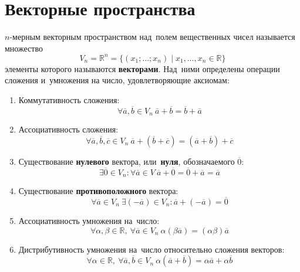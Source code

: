 \section{Векторные пространства}
$n$\nobreakdash-мерным векторным пространством над~полем вещественных чисел называется множество
\begin{equation*}
V_n = \mathbb R^n = \{ (x_1; \ldots; x_n) \mid x_1, \ldots, x_n \in \mathbb R \}
\end{equation*}
элементы которого называются \textbf{векторами}. Над~ними определены операции сложения и~умножения на число, удовлетворяющие аксиомам:
\begin{enumerate}
	\item Коммутативность сложения:
	\begin{equation*}
	\forall \overline a, \overline b \in V_n \ 
	\overline a + \overline b = \overline b + \overline a
	\end{equation*}
	
	\item Ассоциативность сложения:
	\begin{equation*}
	\forall \overline a, \overline b, \overline c \in V_n \ 
	\overline a + (\overline b + \overline c) = (\overline a + \overline b) + \overline c
	\end{equation*}
	
	\item Существование \textbf{нулевого} вектора, или~\textbf{нуля}, обозначаемого $\overline 0$:
	\begin{equation*}
	\exists \overline 0 \in V_n \colon \forall \overline a \in V \ 
	\overline a + \overline 0 = \overline 0 + \overline a = \overline a
	\end{equation*}
	
	\item Существование \textbf{противоположного} вектора:
	\begin{equation*}
	\forall \overline a \in V_n \ 
	\exists (-\overline a) \in V_n \colon
	\overline a + (-\overline a) = \overline 0
	\end{equation*}
	
	\item Ассоциативность умножения на~число:
	\begin{equation*}
	\forall \alpha, \beta \in \mathbb R, \ 
	\forall \overline a \in V_n \ 
	\alpha (\beta \overline a) = (\alpha \beta) \overline a
	\end{equation*}
	
	\item Дистрибутивность умножения на~число относительно сложения векторов:
	\begin{equation*}
	\forall \alpha \in \mathbb R, \ 
	\forall \overline a, \overline b \in V_n \ 
	\alpha (\overline a + \overline b) = \alpha \overline a + \alpha \overline b
	\end{equation*}
	

\end{enumerate}
